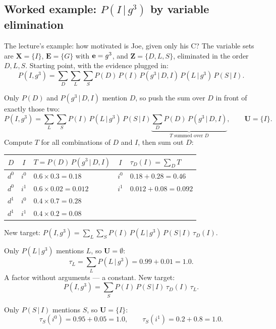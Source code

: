 \documentclass[11pt, oneside]{book}
\newcommand{\Prob}{\mathbb{P}}           %
\newcommand{\given}{\,\vert\,}           %
\newcommand{\bX}{\mathbf{X}}  \newcommand{\bY}{\mathbf{Y}}
\newcommand{\bZ}{\mathbf{Z}}  \newcommand{\bE}{\mathbf{E}}
\let\originalsubsection\subsection
\renewcommand{\subsection}{\Needspace{6\baselineskip}\originalsubsection}
\begin{document}
\subsection{Worked example: \texorpdfstring{$P(I \given g^3)$}{P(I | g3)} by variable elimination}
\label{sec:ve-example}

The lecture's example: how motivated is Joe, given only his C? The variable
sets are $\bX = \{I\}$, $\bE = \{G\}$ with $\mathbf{e} = g^3$, and $\bZ = \{D, L,
S\}$, eliminated in the order $D, L, S$. Starting point, with the evidence
plugged in:
\[
P(I, g^3) = \sum_{D}\sum_{L}\sum_{S} P(D)\, P(I)\, P(g^3 \given D, I)\, P(L \given g^3)\, P(S \given I).
\]

\begin{exbox}[title={Step 1: eliminate $D$}]
Only $P(D)$ and $P(g^3 \given D, I)$ mention $D$, so push the sum over $D$ in
front of exactly those two:
\[
P(I, g^3) = \sum_{L}\sum_{S} P(I)\, P(L \given g^3)\, P(S \given I)
  \underbrace{\sum_{D} P(D)\, P(g^3 \given D, I)}_{T \text{ summed over } D} ,
\qquad \mathbf{U} = \{I\}.
\]
Compute $T$ for all combinations of $D$ and $I$, then sum out $D$:
\begin{center}
\small
\begin{tabular}{@{}ccl@{\qquad}cl@{}}
\toprule
$D$ & $I$ & $T = P(D)\,P(g^3 \given D, I)$ & $I$ & $\tau_D(I) = \sum_D T$ \\
\midrule
$d^0$ & $i^0$ & $0.6 \times 0.3 = 0.18$   & $i^0$ & $0.18 + 0.28 = 0.46$ \\
$d^0$ & $i^1$ & $0.6 \times 0.02 = 0.012$ & $i^1$ & $0.012 + 0.08 = 0.092$ \\
$d^1$ & $i^0$ & $0.4 \times 0.7 = 0.28$   &       & \\
$d^1$ & $i^1$ & $0.4 \times 0.2 = 0.08$   &       & \\
\bottomrule
\end{tabular}
\end{center}
New target: $P(I, g^3) = \sum_L \sum_S P(I)\, P(L \given g^3)\, P(S \given I)\, \tau_D(I)$.
\end{exbox}

\begin{exbox}[title={Step 2: eliminate $L$}]
Only $P(L \given g^3)$ mentions $L$, so $\mathbf{U} = \emptyset$:
\[
\tau_L = \sum_{L} P(L \given g^3) = 0.99 + 0.01 = 1.0 .
\]
A factor without arguments --- a constant. New target:
\[
P(I, g^3) = \sum_S P(I)\, P(S \given I)\, \tau_D(I)\, \tau_L .
\]
\end{exbox}

\begin{exbox}[title={Step 3: eliminate $S$}]
Only $P(S \given I)$ mentions $S$, so $\mathbf{U} = \{I\}$:
\[
\tau_S(i^0) = 0.95 + 0.05 = 1.0, \qquad \tau_S(i^1) = 0.2 + 0.8 = 1.0 .
\]
\end{exbox}
\end{document}
